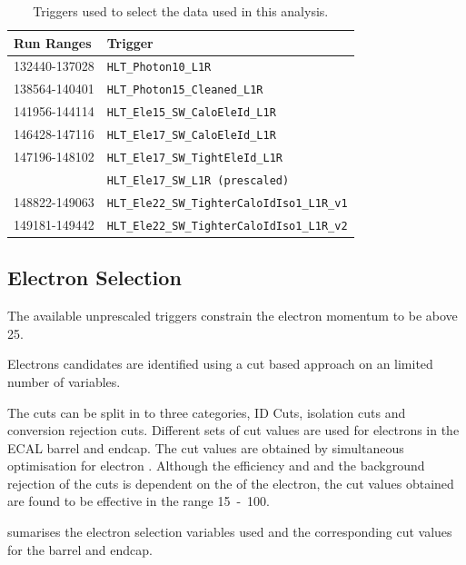 \begin{table}[htb]
  \centering
  \begin{tabular}{ l l }
    Run Ranges & Trigger \\
    \midrule
    132440-137028 & \verb=HLT_Photon10_L1R= \\
    138564-140401 & \verb=HLT_Photon15_Cleaned_L1R= \\
    141956-144114 & \verb=HLT_Ele15_SW_CaloEleId_L1R= \\
    146428-147116 & \verb=HLT_Ele17_SW_CaloEleId_L1R= \\
    147196-148102 & \verb=HLT_Ele17_SW_TightEleId_L1R= \\
                  & \verb=HLT_Ele17_SW_L1R (prescaled)= \\ 
    148822-149063 & \verb=HLT_Ele22_SW_TighterCaloIdIso1_L1R_v1= \\
    149181-149442 & \verb=HLT_Ele22_SW_TighterCaloIdIso1_L1R_v2= \\
  \end{tabular}
  \caption{Triggers used to select the data used in this analysis.}
  \label{asym36:triggers}
\end{table}

\subsection{Electron Selection}

The available unprescaled triggers constrain the electron momentum to be above
\unit{25}{\GeV}.

Electrons candidates are identified using a cut based approach on an limited
number of variables.

The cuts can be split in to three categories, ID Cuts, isolation cuts and
conversion rejection cuts. Different sets of cut values are used for electrons in the
ECAL barrel and endcap. The cut values are obtained by simultaneous optimisation
for electron \unit{}{\GeV}. Although the efficiency and and the background
rejection of the cuts is dependent on the \ET of the electron, the cut values
obtained are found to be effective in the range \unit{15-100}{\GeV}.\cite{}

 sumarises the electron selection variables used and the
corresponding cut values for the barrel and endcap.


